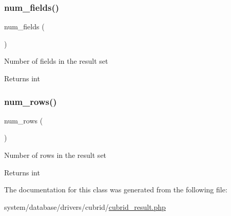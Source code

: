\subsubsection{\texorpdfstring{num\+\_\+fields()}{num\_fields()}}
{\footnotesize\ttfamily num\+\_\+fields (\begin{DoxyParamCaption}{ }\end{DoxyParamCaption})}

Number of fields in the result set

\begin{DoxyReturn}{Returns}
int 
\end{DoxyReturn}
\mbox{\label{class_c_i___d_b__cubrid__result_a218657c303ee499b97710ab0cd2f5d6e}} 
\subsubsection{\texorpdfstring{num\+\_\+rows()}{num\_rows()}}
{\footnotesize\ttfamily num\+\_\+rows (\begin{DoxyParamCaption}{ }\end{DoxyParamCaption})}

Number of rows in the result set

\begin{DoxyReturn}{Returns}
int 
\end{DoxyReturn}


The documentation for this class was generated from the following file\+:\begin{DoxyCompactItemize}
\item 
system/database/drivers/cubrid/\mbox{\hyperlink{cubrid__result_8php}{cubrid\+\_\+result.\+php}}\end{DoxyCompactItemize}
